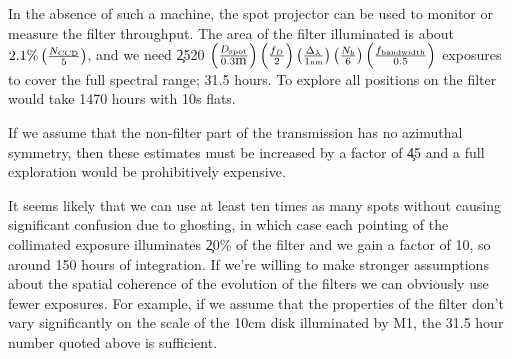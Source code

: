 In the absence of such a machine,
the spot projector can be used to monitor or measure the filter throughput. The area of the filter illuminated
is about $2.1\% \left(\frac{N_{\mbox{\tiny CCD}}}{5}\right)$, and we need \c 2520 $\left(\frac{D_{\mbox{\tiny spot}}}{0.3\mbox{m}}\right) \left(\frac{f_D}{2}\right) \left(\frac{\Delta_\lambda}{1\mbox{\tiny nm}}\right) \left(\frac{N_b}{6}\right)
\left(\frac{f_{\mbox{\tiny bandwidth}}}{0.5}\right)$ exposures to cover the full spectral range; 31.5 hours.  To explore all positions on the
filter would take 1470 hours with 10s flats.

If we assume that the non-filter part of the transmission has no azimuthal symmetry, then these estimates must
be increased by a factor of \c 45 and a full exploration would be prohibitively expensive.

It seems likely that we can use at least ten times as many spots without causing significant confusion due to
ghosting, in which case each pointing of the collimated exposure illuminates \c 20\% of the filter and we gain
a factor of 10, so around 150 hours of integration.  If we're willing to make stronger assumptions about the
spatial coherence of the evolution of the filters we can obviously use fewer exposures.  For example, if we
assume that the properties of the filter don't vary significantly on the scale of the 10cm disk illuminated by
M1, the 31.5 hour number quoted above is sufficient.

\endgroup                               %
